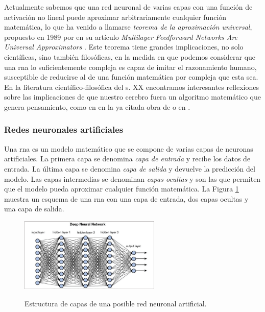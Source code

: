 Actualmente sabemos que una red neuronal de varias capas con una función de activación no lineal puede aproximar arbitrariamente cualquier función matemática, lo que ha venido a llamarse \emph{teorema de la aproximación universal}, propuesto en 1989 por \citeauthor{hornikMultilayerFeedforwardNetworks1989} en su artículo \emph{Multilayer Feedforward Networks Are Universal Approximators} \citep{hornikMultilayerFeedforwardNetworks1989}. Este teorema tiene grandes implicaciones, no solo científicas, sino también filosóficas, en la medida en que podemos considerar que una \gls{rna} lo suficientemente compleja es capaz de imitar el razonamiento humano, susceptible de reducirse al de una función matemática por compleja que esta sea. En la literatura científico-filosófica del s. XX encontramos interesantes reflexiones sobre las implicaciones de que nuestro cerebro fuera un algoritmo matemático que genera pensamiento, como en en la ya citada obra de \cite{penroseNuevaMenteEmperador2015} o en \cite{searleMentesCerebrosCiencia1985}.


\subsubsection{Redes neuronales artificiales}
Una \gls{rna} es un modelo matemático que se compone de varias capas de neuronas artificiales. La primera capa se denomina \emph{capa de entrada} y recibe los datos de entrada. La última capa se denomina \emph{capa de salida} y devuelve la predicción del modelo. Las capas intermedias se denominan \emph{capas ocultas} y son las que permiten que el modelo pueda aproximar cualquier función matemática. La Figura \ref{fig:deep_neural_network} muestra un esquema de una \gls{rna} con una capa de entrada, dos capas ocultas y una capa de salida.


\begin{figure}[H]
    \caption[Estructura de capas de una posible red neuronal artificial]{Estructura de capas de una posible red neuronal artificial.}
    \centering
    \includegraphics[width=0.6\textwidth]{./figuras/Deep_neural_network.png}
    \label{fig:deep_neural_network}
\end{figure}

